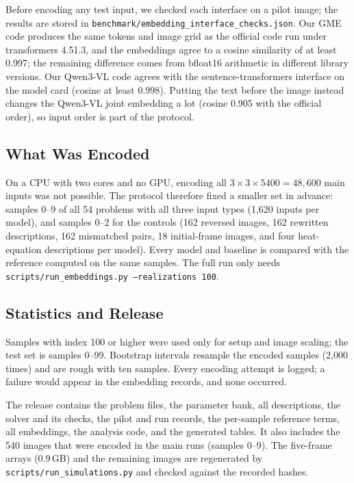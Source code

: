 Before encoding any test input, we checked each interface on a pilot image; the results are stored in \texttt{benchmark/embedding\_interface\_checks.json}. Our GME code produces the same tokens and image grid as the official code run under transformers 4.51.3, and the embeddings agree to a cosine similarity of at least 0.997; the remaining difference comes from bfloat16 arithmetic in different library versions. Our Qwen3-VL code agrees with the sentence-transformers interface on the model card (cosine at least 0.998). Putting the text before the image instead changes the Qwen3-VL joint embedding a lot (cosine 0.905 with the official order), so input order is part of the protocol.

\subsection{What Was Encoded}
On a CPU with two cores and no GPU, encoding all $3\times3\times5400=48{,}600$ main inputs was not possible. The protocol therefore fixed a smaller set in advance: samples 0--9 of all 54 problems with all three input types (1,620 inputs per model), and samples 0--2 for the controls (162 reversed images, 162 rewritten descriptions, 162 mismatched pairs, 18 initial-frame images, and four heat-equation descriptions per model). Every model and baseline is compared with the reference computed on the same samples. The full run only needs \texttt{scripts/run\_embeddings.py --realizations 100}.

\subsection{Statistics and Release}
Samples with index 100 or higher were used only for setup and image scaling; the test set is samples 0--99. Bootstrap intervals resample the encoded samples (2,000 times) and are rough with ten samples. Every encoding attempt is logged; a failure would appear in the embedding records, and none occurred.

The release contains the problem files, the parameter bank, all descriptions, the solver and its checks, the pilot and run records, the per-sample reference terms, all embeddings, the analysis code, and the generated tables. It also includes the 540 images that were encoded in the main runs (samples 0--9). The five-frame arrays (0.9\,GB) and the remaining images are regenerated by \texttt{scripts/run\_simulations.py} and checked against the recorded hashes.
